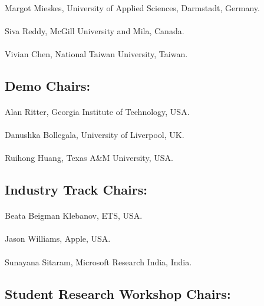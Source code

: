\paragraph{} Margot Mieskes, University of Applied Sciences, Darmstadt, Germany. 
\paragraph{} Siva Reddy, McGill University and Mila, Canada. 
\paragraph{} Vivian Chen, National Taiwan University, Taiwan. 

\subsection*{Demo Chairs:}
\paragraph{} Alan Ritter, Georgia Institute of Technology, USA. 
\paragraph{} Danushka Bollegala, University of Liverpool, UK. 
\paragraph{} Ruihong Huang, Texas A\&M University, USA. 

\subsection*{Industry Track Chairs:}
\paragraph{} Beata Beigman Klebanov, ETS, USA. 
\paragraph{} Jason Williams, Apple, USA. 
\paragraph{} Sunayana Sitaram, Microsoft Research India, India. 

\subsection*{Student Research Workshop Chairs:}
